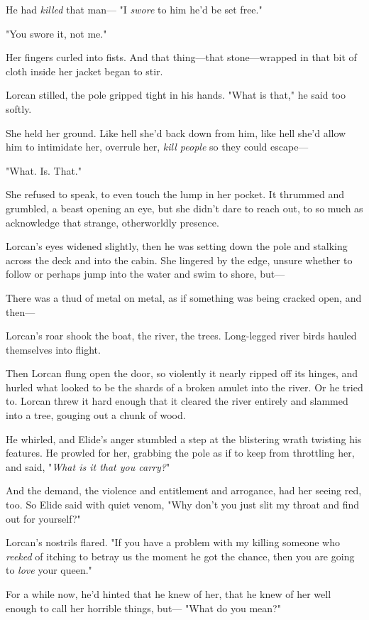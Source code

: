 He had \emph{killed} that man--- "I \emph{swore} to him he'd be set free."

"You swore it, not me."

Her fingers curled into fists. And that thing---that stone---wrapped in that bit of cloth inside her jacket began to stir.

Lorcan stilled, the pole gripped tight in his hands. "What is that," he said too softly.

She held her ground. Like hell she'd back down from him, like hell she'd allow him to intimidate her, overrule her, \emph{kill people} so they could escape---

"What. Is. That."

She refused to speak, to even touch the lump in her pocket. It thrummed and grumbled, a beast opening an eye, but she didn't dare to reach out, to so much as acknowledge that strange, otherworldly presence.

Lorcan's eyes widened slightly, then he was setting down the pole and stalking across the deck and into the cabin. She lingered by the edge, unsure whether to follow or perhaps jump into the water and swim to shore, but---

There was a thud of metal on metal, as if something was being cracked open, and then---

Lorcan's roar shook the boat, the river, the trees. Long-legged river birds hauled themselves into flight.

Then Lorcan flung open the door, so violently it nearly ripped off its hinges, and hurled what looked to be the shards of a broken amulet into the river. Or he tried to. Lorcan threw it hard enough that it cleared the river entirely and slammed into a tree, gouging out a chunk of wood.

He whirled, and Elide's anger stumbled a step at the blistering wrath twisting his features. He prowled for her, grabbing the pole as if to keep from throttling her, and said, "\emph{What is it that you carry?}"

And the demand, the violence and entitlement and arrogance, had her seeing red, too. So Elide said with quiet venom, "Why don't you just slit my throat and find out for yourself?"

Lorcan's nostrils flared. "If you have a problem with my killing someone who \emph{reeked} of itching to betray us the moment he got the chance, then you are going to \emph{love} your queen."

For a while now, he'd hinted that he knew of her, that he knew of her well enough to call her horrible things, but--- "What do you mean?"

